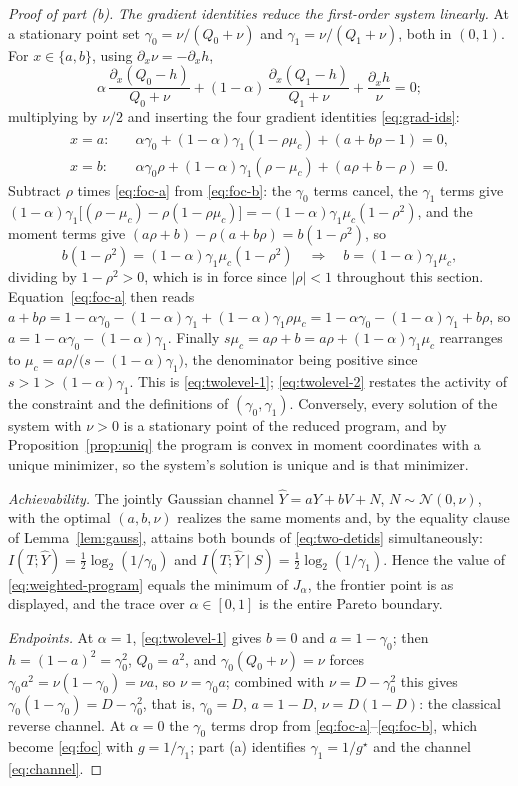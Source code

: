 \documentclass[11pt,onecolumn]{IEEEtran}
\newcommand{\hY}{\widehat{Y}}
\begin{document}
\begin{proof}[Proof of part (b)]
\emph{The gradient identities reduce the first-order system linearly.}
At a stationary point set $\gamma_0=\nu/(Q_0+\nu)$ and
$\gamma_1=\nu/(Q_1+\nu)$, both in $(0,1)$. For $x\in\{a,b\}$, using
$\partial_x\nu=-\partial_xh$,
\[
\alpha\,\frac{\partial_x(Q_0-h)}{Q_0+\nu}
+(1-\alpha)\,\frac{\partial_x(Q_1-h)}{Q_1+\nu}
+\frac{\partial_xh}{\nu}=0 ;
\]
multiplying by $\nu/2$ and inserting the four gradient identities
\eqref{eq:grad-ids}:
\begin{align}
x=a:&\quad
\alpha\gamma_0+(1-\alpha)\gamma_1(1-\rho\mu_c)+(a+b\rho-1)=0,
\label{eq:foc-a}\\
x=b:&\quad
\alpha\gamma_0\rho+(1-\alpha)\gamma_1(\rho-\mu_c)+(a\rho+b-\rho)=0 .
\label{eq:foc-b}
\end{align}
Subtract $\rho$ times \eqref{eq:foc-a} from \eqref{eq:foc-b}: the
$\gamma_0$ terms cancel, the $\gamma_1$ terms give
$(1-\alpha)\gamma_1\bigl[(\rho-\mu_c)-\rho(1-\rho\mu_c)\bigr]
=-(1-\alpha)\gamma_1\mu_c(1-\rho^2)$, and the moment terms give
$(a\rho+b)-\rho(a+b\rho)=b(1-\rho^2)$, so
\[
b(1-\rho^2)=(1-\alpha)\gamma_1\mu_c(1-\rho^2)
\quad\Longrightarrow\quad
b=(1-\alpha)\gamma_1\mu_c ,
\]
dividing by $1-\rho^2>0$, which is in force since $|\rho|<1$
throughout this section.
Equation~\eqref{eq:foc-a} then reads
$a+b\rho=1-\alpha\gamma_0-(1-\alpha)\gamma_1+(1-\alpha)\gamma_1\rho\mu_c
=1-\alpha\gamma_0-(1-\alpha)\gamma_1+b\rho$, so
$a=1-\alpha\gamma_0-(1-\alpha)\gamma_1$. Finally
$s\mu_c=a\rho+b=a\rho+(1-\alpha)\gamma_1\mu_c$ rearranges to
$\mu_c=a\rho/\bigl(s-(1-\alpha)\gamma_1\bigr)$, the denominator being
positive since $s>1>(1-\alpha)\gamma_1$. This is
\eqref{eq:twolevel-1}; \eqref{eq:twolevel-2} restates the activity of
the constraint and the definitions of $(\gamma_0,\gamma_1)$.
Conversely, every solution of the system with $\nu>0$ is a stationary
point of the reduced program, and by Proposition~\ref{prop:uniq}
the program is convex in moment coordinates with a unique minimizer, so
the system's solution is unique and is that minimizer.

\emph{Achievability.} The jointly Gaussian channel $\hY=aY+bV+N$,
$N\sim\mathcal N(0,\nu)$, with the optimal $(a,b,\nu)$ realizes the same
moments and, by the equality clause of Lemma~\ref{lem:gauss}, attains
both bounds of \eqref{eq:two-detids} simultaneously:
$I(T;\hY)=\tfrac12\log_2(1/\gamma_0)$ and
$I(T;\hY\mid S)=\tfrac12\log_2(1/\gamma_1)$. Hence the value of
\eqref{eq:weighted-program} equals the minimum of $J_\alpha$, the
frontier point is as displayed, and the trace over $\alpha\in[0,1]$ is
the entire Pareto boundary.

\emph{Endpoints.} At $\alpha=1$, \eqref{eq:twolevel-1} gives $b=0$ and
$a=1-\gamma_0$; then $h=(1-a)^2=\gamma_0^2$, $Q_0=a^2$, and
$\gamma_0(Q_0+\nu)=\nu$ forces $\gamma_0a^2=\nu(1-\gamma_0)=\nu a$, so
$\nu=\gamma_0a$; combined with $\nu=D-\gamma_0^2$ this gives
$\gamma_0(1-\gamma_0)=D-\gamma_0^2$, that is, $\gamma_0=D$, $a=1-D$,
$\nu=D(1-D)$: the classical reverse channel. At $\alpha=0$ the
$\gamma_0$ terms drop from \eqref{eq:foc-a}--\eqref{eq:foc-b}, which
become \eqref{eq:foc} with $g=1/\gamma_1$; part (a)
identifies $\gamma_1=1/g^\star$ and the channel \eqref{eq:channel}.
\end{proof}
\end{document}
